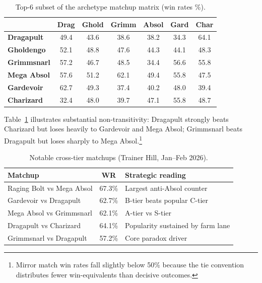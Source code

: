 \documentclass[journal]{IEEEtran}
\begin{document}
\begin{table}[!t]
\centering
\caption{Top-6 subset of the archetype matchup matrix (win rates \%).}
\label{tab:matchup}
\begin{tabular}{lcccccc}
\toprule
 & \textbf{Drag} & \textbf{Ghold} & \textbf{Grimm} & \textbf{Absol} & \textbf{Gard} & \textbf{Char} \\
\midrule
\textbf{Dragapult}  & 49.4 & 43.6 & 38.6 & 38.2 & 34.3 & 64.1 \\
\textbf{Gholdengo}  & 52.1 & 48.8 & 47.6 & 44.3 & 44.1 & 48.3 \\
\textbf{Grimmsnarl} & 57.2 & 46.7 & 48.5 & 34.4 & 56.6 & 55.8 \\
\textbf{Mega Absol} & 57.6 & 51.2 & 62.1 & 49.4 & 55.8 & 47.5 \\
\textbf{Gardevoir}  & 62.7 & 49.3 & 37.4 & 40.2 & 48.0 & 39.4 \\
\textbf{Charizard}  & 32.4 & 48.0 & 39.7 & 47.1 & 55.8 & 48.7 \\
\bottomrule
\end{tabular}
\end{table}

Table~\ref{tab:matchup} illustrates substantial non-transitivity: Dragapult strongly beats Charizard but loses heavily to Gardevoir and Mega Absol; Grimmsnarl beats Dragapult but loses sharply to Mega Absol.\footnote{Mirror match win rates fall slightly below 50\% because the tie convention distributes fewer win-equivalents than decisive outcomes.}

\begin{table}[!t]
\centering
\caption{Notable cross-tier matchups (Trainer Hill, Jan--Feb 2026).}
\label{tab:crosstier}
\begin{tabular}{p{3.2cm}cp{3.1cm}}
\toprule
\textbf{Matchup} & \textbf{WR} & \textbf{Strategic reading} \\
\midrule
Raging Bolt vs Mega Absol & 67.3\% & Largest anti-Absol counter \\
Gardevoir vs Dragapult & 62.7\% & B-tier beats popular C-tier \\
Mega Absol vs Grimmsnarl & 62.1\% & A-tier vs S-tier \\
Dragapult vs Charizard & 64.1\% & Popularity sustained by farm lane \\
Grimmsnarl vs Dragapult & 57.2\% & Core paradox driver \\
\bottomrule
\end{tabular}
\end{table}
\end{document}
